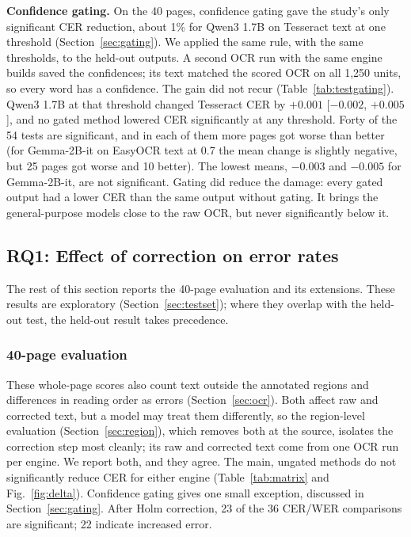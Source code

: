 \documentclass[conference]{IEEEtran}
\begin{document}


\textbf{Confidence gating.} On the 40 pages, confidence gating gave the study's only significant CER reduction, about 1\% for Qwen3 1.7B on Tesseract text at one threshold (Section~\ref{sec:gating}). We applied the same rule, with the same thresholds, to the held-out outputs. A second OCR run with the same engine builds saved the confidences; its text matched the scored OCR on all 1{,}250 units, so every word has a confidence. The gain did not recur (Table~\ref{tab:testgating}). Qwen3 1.7B at that threshold changed Tesseract CER by $+0.001$ [$-0.002$, $+0.005$], and no gated method lowered CER significantly at any threshold. Forty of the 54 tests are significant, and in each of them more pages got worse than better (for Gemma-2B-it on EasyOCR text at 0.7 the mean change is slightly negative, but 25 pages got worse and 10 better). The lowest means, $-0.003$ and $-0.005$ for Gemma-2B-it, are not significant. Gating did reduce the damage: every gated output had a lower CER than the same output without gating. It brings the general-purpose models close to the raw OCR, but never significantly below it.



\subsection{RQ1: Effect of correction on error rates}
\label{sec:rq1}
The rest of this section reports the 40-page evaluation and its extensions. These results are exploratory (Section~\ref{sec:testset}); where they overlap with the held-out test, the held-out result takes precedence.

\subsubsection{40-page evaluation}
\label{sec:main}
These whole-page scores also count text outside the annotated regions and differences in reading order as errors (Section~\ref{sec:ocr}). Both affect raw and corrected text, but a model may treat them differently, so the region-level evaluation (Section~\ref{sec:region}), which removes both at the source, isolates the correction step most cleanly; its raw and corrected text come from one OCR run per engine. We report both, and they agree. The main, ungated methods do not significantly reduce CER for either engine (Table~\ref{tab:matrix} and Fig.~\ref{fig:delta}). Confidence gating gives one small exception, discussed in Section~\ref{sec:gating}. After Holm correction, 23 of the 36 CER/WER comparisons are significant; 22 indicate increased error.
\end{document}

